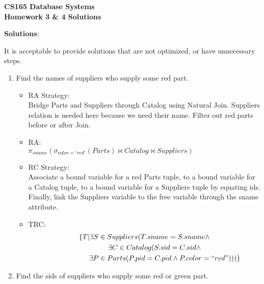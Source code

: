 \documentclass[12pt]{article}
\begin{document}
\begin{center}
{\bf CS165 Database Systems  
\\ Homework 3 \& 4 Solutions
}
\end{center}

\setlength{\unitlength}{1in}
\noindent \textbf{Solutions}:

\noindent It is acceptable to provide solutions that are not optimized, or have unnecessary steps. 

\begin{enumerate}
	\item Find the names of suppliers who supply some red part.

\begin{itemize}
\item RA Strategy: \\
Bridge Parts and Suppliers through Catalog using Natural Join. Suppliers relation is needed here because we need their name. Filter out red parts before or after Join.
\item RA: 
\\ $\pi_{sname}(\sigma_{color='red'}(Parts) \bowtie Catalog \bowtie Suppliers)$
\item RC Strategy: \\
Associate a bound variable for a red Parts tuple, to a bound variable for a Catalog tuple, to a bound variable for a Suppliers tuple by equating ids. Finally, link the Suppliers variable to the free variable through the sname attribute.
\item TRC:
\begin{multline*}
\{T|\exists S \in Suppliers(T.sname = S.sname \wedge \\
	\hspace{1cm}\exists C \in Catalog(S.sid = C.sid \wedge \\
	\hspace{2cm}\exists P \in Parts(P.pid = C.pid \wedge P.color=``red")))\} \\
\end{multline*}
\end{itemize}
	
	\item Find the sids of suppliers who supply some red or green part.
	

\end{enumerate}
\end{document}
